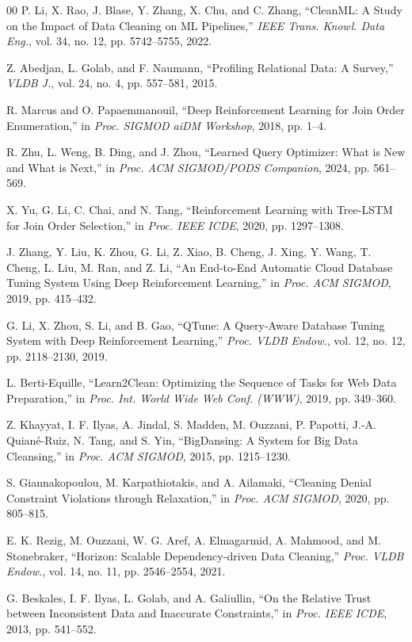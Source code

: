 \documentclass[sigconf]{acmart}
\begin{document}
\begin{thebibliography}{00}
P. Li, X. Rao, J. Blase, Y. Zhang, X. Chu, and C. Zhang,
``CleanML: A Study on the Impact of Data Cleaning on ML Pipelines,''
\textit{IEEE Trans. Knowl. Data Eng.}, vol. 34, no. 12, pp. 5742--5755, 2022.

Z. Abedjan, L. Golab, and F. Naumann,
``Profiling Relational Data: A Survey,''
\textit{VLDB J.}, vol. 24, no. 4, pp. 557--581, 2015.

R. Marcus and O. Papaemmanouil,
``Deep Reinforcement Learning for Join Order Enumeration,''
in \textit{Proc. SIGMOD aiDM Workshop}, 2018, pp. 1--4.

R. Zhu, L. Weng, B. Ding, and J. Zhou,
``Learned Query Optimizer: What is New and What is Next,''
in \textit{Proc. ACM SIGMOD/PODS Companion}, 2024, pp. 561--569.

X. Yu, G. Li, C. Chai, and N. Tang,
``Reinforcement Learning with Tree-LSTM for Join Order Selection,''
in \textit{Proc. IEEE ICDE}, 2020, pp. 1297--1308.

J. Zhang, Y. Liu, K. Zhou, G. Li, Z. Xiao, B. Cheng, J. Xing, Y. Wang, T. Cheng, L. Liu, M. Ran, and Z. Li,
``An End-to-End Automatic Cloud Database Tuning System Using Deep Reinforcement Learning,''
in \textit{Proc. ACM SIGMOD}, 2019, pp. 415--432.

G. Li, X. Zhou, S. Li, and B. Gao,
``QTune: A Query-Aware Database Tuning System with Deep Reinforcement Learning,''
\textit{Proc. VLDB Endow.}, vol. 12, no. 12, pp. 2118--2130, 2019.

L. Berti-Equille,
``Learn2Clean: Optimizing the Sequence of Tasks for Web Data Preparation,''
in \textit{Proc. Int. World Wide Web Conf. (WWW)},
2019, pp. 349--360.

Z. Khayyat, I. F. Ilyas, A. Jindal, S. Madden, M. Ouzzani, P. Papotti, J.-A. Quian\'{e}-Ruiz, N. Tang, and S. Yin,
``BigDansing: A System for Big Data Cleansing,''
in \textit{Proc. ACM SIGMOD}, 2015, pp. 1215--1230.

S. Giannakopoulou, M. Karpathiotakis, and A. Ailamaki,
``Cleaning Denial Constraint Violations through Relaxation,''
in \textit{Proc. ACM SIGMOD}, 2020, pp. 805--815.

E. K. Rezig, M. Ouzzani, W. G. Aref, A. Elmagarmid, A. Mahmood, and M. Stonebraker,
``Horizon: Scalable Dependency-driven Data Cleaning,''
\textit{Proc. VLDB Endow.}, vol. 14, no. 11, pp. 2546--2554, 2021.

G. Beskales, I. F. Ilyas, L. Golab, and A. Galiullin,
``On the Relative Trust between Inconsistent Data and Inaccurate Constraints,''
in \textit{Proc. IEEE ICDE}, 2013, pp. 541--552.


\end{thebibliography}
\end{document}
